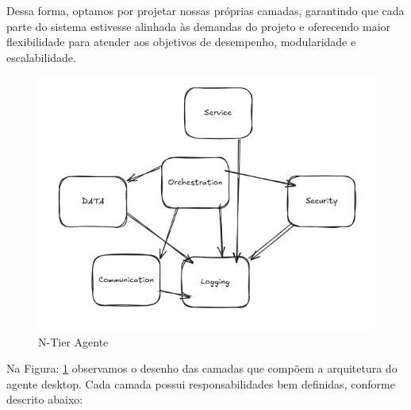 Dessa forma, optamos por projetar nossas próprias camadas, garantindo que cada parte do sistema estivesse alinhada às demandas do projeto e oferecendo maior flexibilidade para atender aos objetivos de desempenho, modularidade e escalabilidade.

\begin{figure}[H]
    \centering
    \includegraphics[width=1\linewidth]{figuras/NtierAgente.png}
    \caption{N-Tier Agente}
    \label{fig:NTagente}
\end{figure}

Na Figura: \ref{fig:NTagente} observamos o desenho das camadas que compõem a arquitetura do agente desktop. Cada camada possui responsabilidades bem definidas, conforme descrito abaixo:

